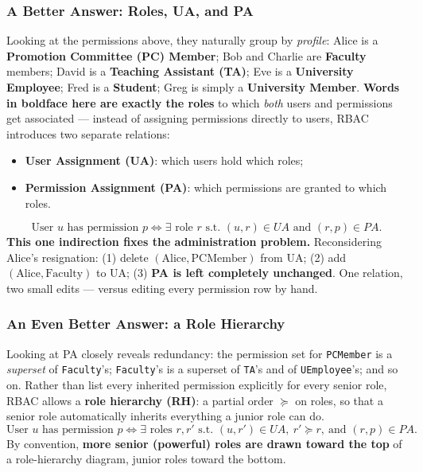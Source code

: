 \documentclass[12pt, a4paper]{article}
\begin{document}
\subsubsection{A Better Answer: Roles, UA, and PA}
Looking at the permissions above, they naturally group by \emph{profile}: Alice is a \textbf{Promotion Committee (PC) Member}; Bob and Charlie are \textbf{Faculty} members; David is a \textbf{Teaching Assistant (TA)}; Eve is a \textbf{University Employee}; Fred is a \textbf{Student}; Greg is simply a \textbf{University Member}. \textbf{Words in boldface here are exactly the roles} to which \emph{both} users and permissions get associated --- instead of assigning permissions directly to users, RBAC introduces two separate relations:
\begin{itemize}
    \item \textbf{User Assignment (UA)}: which users hold which roles;
    \item \textbf{Permission Assignment (PA)}: which permissions are granted to which roles.
\end{itemize}
\[
\text{User } u \text{ has permission } p \iff \exists \text{ role } r \text{ s.t. } (u,r)\in UA \text{ and } (r,p)\in PA.
\]
\textcolor{ForestGreen!60!black}{\textbf{This one indirection fixes the administration problem.}} Reconsidering Alice's resignation: (1) delete $(\text{Alice},\text{PCMember})$ from UA; (2) add $(\text{Alice},\text{Faculty})$ to UA; (3) \textbf{PA is left completely unchanged}. One relation, two small edits --- versus editing every permission row by hand.

\subsubsection{An Even Better Answer: a Role Hierarchy}
Looking at PA closely reveals redundancy: the permission set for \texttt{PCMember} is a \emph{superset} of \texttt{Faculty}'s; \texttt{Faculty}'s is a superset of \texttt{TA}'s and of \texttt{UEmployee}'s; and so on. Rather than list every inherited permission explicitly for every senior role, RBAC allows a \textbf{role hierarchy (RH)}: a partial order $\succeq$ on roles, so that a senior role automatically inherits everything a junior role can do.
\[
\text{User } u \text{ has permission } p \iff \exists \text{ roles } r, r' \text{ s.t. } (u,r')\in UA,\ r' \succeq r,\ \text{and } (r,p)\in PA.
\]
By convention, \textbf{more senior (powerful) roles are drawn toward the top} of a role-hierarchy diagram, junior roles toward the bottom.
\end{document}
